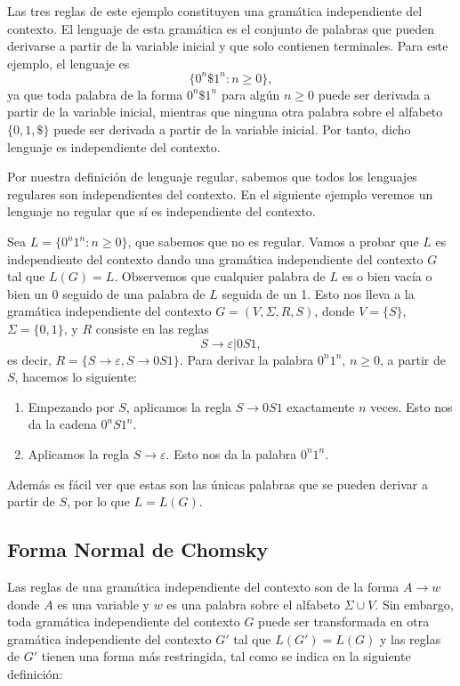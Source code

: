\documentclass[twoside]{article}
\begin{document}
\begin{ej}
Las tres reglas de este ejemplo constituyen una gramática independiente del contexto. El lenguaje de esta gramática es el conjunto de palabras que pueden derivarse a partir de la variable inicial y que solo contienen terminales. Para este ejemplo, el lenguaje es
$$\{0^n\$ 1^n: n\geq 0\},$$
ya que toda palabra de la forma $0^n\$ 1^n$ para algún $n\geq 0$ puede ser derivada a partir de la variable inicial, mientras que ninguna otra palabra sobre el alfabeto $\{0,1,\$\}$ puede ser derivada a partir de la variable inicial. Por tanto, dicho lenguaje es independiente del contexto.
\end{ej}

Por nuestra definición de lenguaje regular, sabemos que todos los lenguajes regulares son independientes del contexto. En el siguiente ejemplo veremos un lenguaje no regular que sí es independiente del contexto. 


\begin{ej}
Sea $L=\{0^n1^n: n\geq 0\}$, que sabemos que no es regular. Vamos a probar que $L$ es independiente del contexto dando una gramática independiente del contexto $G$ tal que $L(G)=L$. Observemos que cualquier palabra de $L$ es o bien vacía o bien un 0 seguido de una palabra de $L$ seguida de un 1. Esto nos lleva a la gramática independiente del contexto $G=(V,\Sigma,R,S)$, donde $V=\{S\}$, $\Sigma=\{0,1\}$, y $R$ consiste en las reglas
$$S\to\varepsilon|0S1,$$
es decir, $R=\{S\to\varepsilon, S\to 0S1\}$. Para derivar la palabra $0^n1^n$, $n\geq 0$, a partir de $S$, hacemos lo siguiente:
\begin{enumerate}
\item Empezando por $S$, aplicamos la regla $S\to 0S1$ exactamente $n$ veces. Esto nos da la cadena $0^nS1^n$.
\item Aplicamos la regla $S\to\varepsilon$. Esto nos da la palabra $0^n1^n$. 
\end{enumerate}
Además es fácil ver que estas son las únicas palabras que se pueden derivar a partir de $S$, por lo que $L=L(G)$.
\end{ej}
\subsection{Forma Normal de Chomsky}
Las reglas de una gramática independiente del contexto son de la forma $A\to w$ donde $A$ es una variable y $w$ es una palabra sobre el alfabeto $\Sigma\cup V$. Sin embargo, toda gramática independiente del contexto $G$ puede ser transformada en otra gramática independiente del contexto $G'$ tal que $L(G')=L(G)$ y las reglas de $G'$ tienen una forma más restringida, tal como se indica en la siguiente definición:
\end{document}
